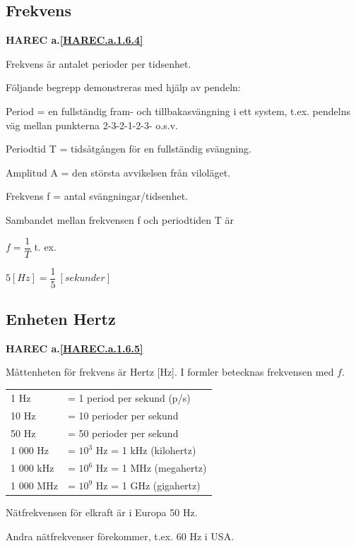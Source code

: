 \subsection{Frekvens}
\textbf{HAREC a.\ref{HAREC.a.1.6.4}\label{myHAREC.a.1.6.4}}

Frekvens är antalet perioder per tidsenhet.

Följande begrepp demonstreras med hjälp av pendeln:

Period = en fullständig fram- och tillbakasvängning i ett system, t.ex.
pendelns väg mellan punkterna 2-3-2-1-2-3- o.s.v.

Periodtid T = tidsåtgången för en fullständig svängning.

Amplitud A = den största avvikelsen från viloläget.

Frekvens f = antal svängningar/tidsenhet.

Sambandet mellan frekvensen f och periodtiden T är

\(f=\dfrac{1}{T}\) t. ex.

\(5 [H z] = \dfrac{1}{5}\ [sekunder]\)

\subsection{Enheten Hertz}
\textbf{HAREC a.\ref{HAREC.a.1.6.5}\label{myHAREC.a.1.6.5}}

Måttenheten för frekvens är Hertz [Hz].
I formler betecknas frekvensen med \(f\).

\begin{center}
\begin{tabular}{ll}
1 Hz      & = 1 period per sekund (p/s) \\
10 Hz     & = 10 perioder per sekund \\
50 Hz     & = 50 perioder per sekund \\
1 000 Hz  & = \(10^3\) Hz = 1 kHz (kilohertz) \\
1 000 kHz & = \(10^6\) Hz = 1 MHz (megahertz) \\
1 000 MHz & = \(10^9\) Hz = 1 GHz (gigahertz) \\
\end{tabular}
\end{center}

Nätfrekvensen för elkraft är i Europa 50 Hz.

Andra nätfrekvenser förekommer, t.ex. 60 Hz i USA.

